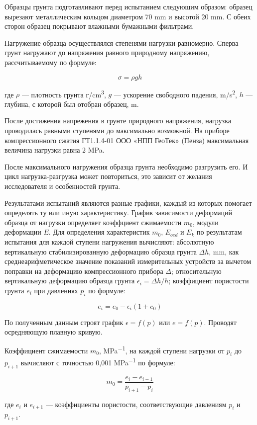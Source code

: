 Образцы грунта подготавливают перед испытанием следующим образом:
образец вырезают металлическим кольцом диаметром 70 \si{\milli\meter} 
и высотой 20 \si{\milli\meter}. С обеих сторон образец покрывают 
влажными бумажными фильтрами. 

Нагружение образца осуществлялся степенями нагрузки равномерно. 
Сперва грунт нагружают до напряжения равного природному 
напряжению, рассчитываемому по формуле: 

\[
   \sigma = \rho g h
\]

где $\rho$ --- плотность грунта г/\si{\centi\meter^3},
$g$ --- ускорение свободного падения, \si{\meter}/\si{\second^2},
$h$ --- глубина, с которой был отобран образец, \si{\meter}.

После достижения напрежения в грунте природного напряжения, нагрузка 
проводилась равными ступенями до максимально возможной. На приборе 
компрессионного сжатия ГТ1.1.4-01 ООО «НПП ГеоТек» (Пенза) максимальная 
величина нагрузки равна 2 \si{\mega\pascal}.

После максимального нагружения образца грунта необходимо разгрузить
его. И цикл нагрузка-разгрузка может повториться, это зависит от 
желания исследователя и особенностей грунта.

Результатами испытаний являются разные графики, каждый из которых 
помогает определять ту или иную характеристику. 
График зависимости деформаций образца от нагрузки 
определяет коэффциент сжимаемости $m_0$, 
модули деформации $E$.
Для определения характеристик $m_0$, $E_{oed}$ и $E_k$ 
по результатам
испытания для каждой ступени нагружения вычисляют:
абсолютную вертикальную стабилизированную деформацию образца
грунта $\Delta h$, \si{\milli\meter}, как среднеарифметическое значение показаний
измерительных устройств за вычетом поправки на деформацию
компрессионного прибора $\Delta$; относительную вертикальную деформацию образца грунта \(\epsilon_i = \Delta h/h\);
коэффициент пористости грунта $e_i$ при давлениях $p_i$ по формуле:

\[
   e_i = e_0 - \epsilon_i(1+e_0)
\]

По полученным данным строят график \(\epsilon = f(p)\) или
\(e = f(p)\). Проводят осредняющую плавную кривую.

Коэффициент сжимаемости $m_0$, \si{\mega\pascal^{-1}}, на каждой ступени нагрузки
от $p_i$ до $p_{i+1}$ вычисляют с точностью 0,001 \si{\mega\pascal^{-1}} по формуле:

\[
   m_0 = \frac{e_i - e_{i-1}}{p_{i+1} - p_i}
\]

где $e_i$ и $e_{i+1}$ --- коэффициенты пористости, соответствующие давлениям $p_i$ и $p_{i+1}$.

